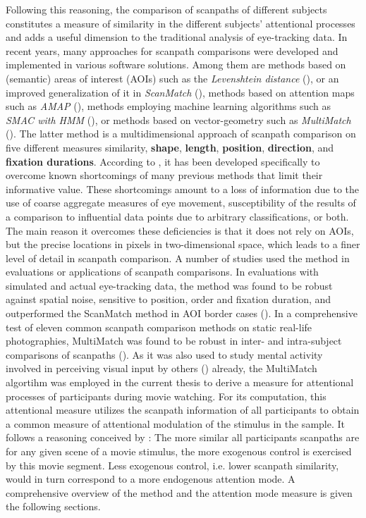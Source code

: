\documentclass[a4paper, 12pt]{scrreprt}
\begin{document}
Following this reasoning, the comparison of scanpaths of different subjects constitutes a measure of similarity in the different subjects’ attentional processes and adds a useful dimension to the traditional analysis of eye-tracking data. \newline
In recent years, many approaches for scanpath comparisons were developed and implemented in various software solutions. Among them are methods based on (semantic) areas of interest (AOIs) such as the \textit{Levenshtein distance} (\cite{levenshtein1966binary}), or an improved generalization of it in \textit{ScanMatch} (\cite{cristino2010scanmatch}), methods based on attention maps such as \textit{AMAP} (\cite{ouerhani2004empirical}), methods employing machine learning algorithms such as \textit{SMAC with HMM} (\cite{coutrot2018scanpath}), or methods based on vector-geometry such as \textit{MultiMatch} (\cite{jarodzka2010vector}). The latter method is a multidimensional approach of scanpath comparison on five different measures similarity, \textbf{shape}, \textbf{length}, \textbf{position}, \textbf{direction}, and \textbf{fixation durations}. According to \textcite{jarodzka2010vector}, it has been developed specifically to overcome known shortcomings of many previous methods that limit their informative value. These shortcomings amount to a loss of information due to the use of coarse aggregate measures of eye movement, susceptibility of the results of a comparison to influential data points due to arbitrary classifications, or both. The main reason it overcomes these deficiencies is that it does not rely on AOIs, but the precise locations in pixels in two-dimensional space, which leads to a finer level of detail in scanpath comparison. \newline A number of studies used the method in evaluations or applications of scanpath comparisons. In evaluations with simulated and actual eye-tracking data, the method was found to be robust against spatial noise, sensitive to position, order and fixation duration, and outperformed the ScanMatch method in AOI border cases (\cite{dewhurst2012depends}). In a comprehensive test of eleven common scanpath comparison methods on static real-life photographies, MultiMatch was found to be robust in inter- and intra-subject comparisons of scanpaths (\cite{anderson2015comparison}). As it was also used to study mental activity involved in perceiving visual input by others (\cite{french2017evaluation}) already, the MultiMatch algortihm was employed in the current thesis to derive a measure for attentional processes of participants during movie watching. \newline
For its computation, this attentional measure utilizes the scanpath information of all participants to obtain a common measure of attentional modulation of the stimulus in the sample. It follows a reasoning conceived by \textcite{baumgartner}: The more similar all participants scanpaths are for any given scene of a movie stimulus, the more exogenous control is exercised by this movie segment. Less exogenous control, i.e. lower scanpath similarity, would in turn correspond to a more endogenous attention mode.
A comprehensive overview of the method and the attention mode measure is given the following sections.
 
\end{document}
